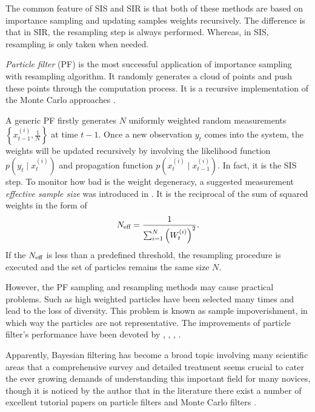 The common feature of SIS and SIR is that both of these methods are based on importance sampling and updating samples weights recursively. The difference is that in SIR, the resampling step is always performed. Whereas, in SIS, resampling is only taken when needed. 


\textit{Particle filter} (PF) is the most successful application of importance sampling with resampling algorithm. It randomly generates a cloud of points and push these points through the computation process. It is a recursive implementation of the Monte Carlo approaches \cite{doucet2009tutorial}. 


A generic PF firstly generates $N$ uniformly weighted random measurements $\left\lbrace x_{t-1}^{(i)},\frac{1}{N} \right\rbrace$ at time $t-1$. Once a new observation $y_t$ comes into the system, the weights will be updated recursively by involving the likelihood function $p(y_t\mid x_t^{(i)})$ and propagation function $p(x_t^{(i)}\mid x_{t-1}^{(i)})$. In fact, it is the SIS step. To monitor how bad is the weight degeneracy, a suggested measurement \textit{effective sample size} was introduced in \cite{kong1994sequential}. It is the reciprocal of the sum of squared weights in the form of 
\begin{equation*}
N_{\mbox{\scriptsize eff}} = \frac{1}{\sum_{i=1}^{N}\left(W_t^{(i)} \right)^2}. 
\end{equation*}
If the $N_{\mbox{\scriptsize eff}}$ is less than a predefined threshold, the resampling procedure is executed and the set of particles remains the same size $N$. 



However, the PF sampling and resampling methods may cause practical problems. Such as high weighted particles have been selected many times and lead to the loss of diversity. This problem is known as sample impoverishment, in which way the particles are not representative. The improvements of particle filter's performance have been devoted by \cite{carpenter1999improved}, \cite{godsill2001maximum}, \cite{stavropoulos2001improved}, \cite{smcmip2011}. 


Apparently, Bayesian filtering has become a broad topic involving many scientific areas that a comprehensive survey and detailed treatment seems crucial to cater the ever growing demands of understanding this important field for many novices, though it is noticed by the author that in the literature there exist a number of excellent tutorial papers on particle filters and Monte Carlo filters \cite{chen2003bayesian} \cite{doucet2000sequential} \cite{doucet2000rao} \cite{chen2012monte}.  
 



